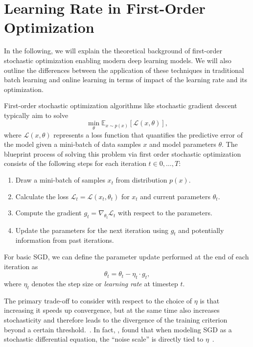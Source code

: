 \documentclass[runningheads]{llncs}
\begin{document}
\section{Learning Rate in First-Order Optimization}

In the following, we will explain the theoretical background of first-order stochastic optimization enabling modern deep learning models.
We will also outline the differences between the application of these techniques in traditional batch learning and online learning in terms of impact of the learning rate and its optimization.

First-order stochastic optimization algorithms like stochastic gradient descent typically aim to solve
\begin{equation}
	\min_{\theta} \mathbb{E}_{x \sim p(x)} [\mathcal{L}(x, \theta)],
\end{equation}
where $\mathcal{L}(x, \theta)$ represents a loss function that quantifies the predictive error of the model given a mini-batch of data samples $x$ and model parameters $\theta$.
The blueprint process of solving this problem via first order stochastic optimization consists of the following steps for each iteration $t \in 0, \ldots, T$:
\begin{enumerate}
	\item Draw a mini-batch of samples $x_t$ from distribution $p(x)$.
	\item Calculate the loss $\mathcal{L}_t = \mathcal{L}(x_t, \theta_t)$ for $x_t$ and current parameters $\theta_t$.
	\item Compute the gradient $g_t = \nabla_{\theta_t} \mathcal{L}_t$ with respect to the parameters.
	\item Update the parameters for the next iteration using $g_t$ and potentially information from past iterations.
\end{enumerate}

For basic SGD, we can define the parameter update performed at the end of each iteration as
\begin{equation}
	\theta_{t}  = \theta_{t} - \eta_t \cdot g_t,
\end{equation}
where $\eta_t$ denotes the step size or \textit{learning rate} at timestep $t$.

The primary trade-off to consider with respect to the choice of $\eta$ is that increasing it speeds up convergence, but at the same time also increases stochasticity and therefore leads to the divergence of the training criterion beyond a certain threshold.~\cite{bengioPracticalRecommendationsGradientbased2012}.
In fact, \textcite{smithBayesianPerspectiveGeneralization2018}, found that when modeling SGD as a stochastic differential equation, the “noise scale” is directly tied to $\eta$~\cite{smithBayesianPerspectiveGeneralization2018}.
\end{document}
